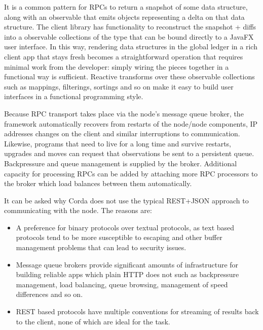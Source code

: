 \documentclass{article}
\begin{document}
It is a common pattern for RPCs to return a snapshot of some data structure, along with an observable that emits
objects representing a delta on that data structure. The client library has functionality to reconstruct the
snapshot + diffs into a observable collections of the type that can be bound directly to a JavaFX user interface.
In this way, rendering data structures in the global ledger in a rich client app that stays fresh becomes a
straightforward operation that requires minimal work from the developer: simply wiring the pieces together in
a functional way is sufficient. Reactive transforms over these observable collections such as mappings,
filterings, sortings and so on make it easy to build user interfaces in a functional programming style.

Because RPC transport takes place via the node's message queue broker, the framework automatically recovers
from restarts of the node/node components, IP addresses changes on the client and similar interruptions to
communication. Likewise, programs that need to live for a long time and survive restarts, upgrades and moves
can request that observations be sent to a persistent queue. Backpressure and queue management is supplied by
the broker. Additional capacity for processing RPCs can be added by attaching more RPC processors to the broker
which load balances between them automatically.

It can be asked why Corda does not use the typical REST+JSON approach to communicating with the node. The reasons
are:

\begin{itemize}
\item A preference for binary protocols over textual protocols, as text based protocols tend to be more
susceptible to escaping and other buffer management problems that can lead to security issues.
\item Message queue brokers provide significant amounts of infrastructure for building reliable apps
which plain HTTP does not such as backpressure management, load balancing, queue browsing, management of speed
differences and so on.
\item REST based protocols have multiple conventions for streaming of results back to the client, none of which
are ideal for the task.
\end{itemize}

\end{document}

